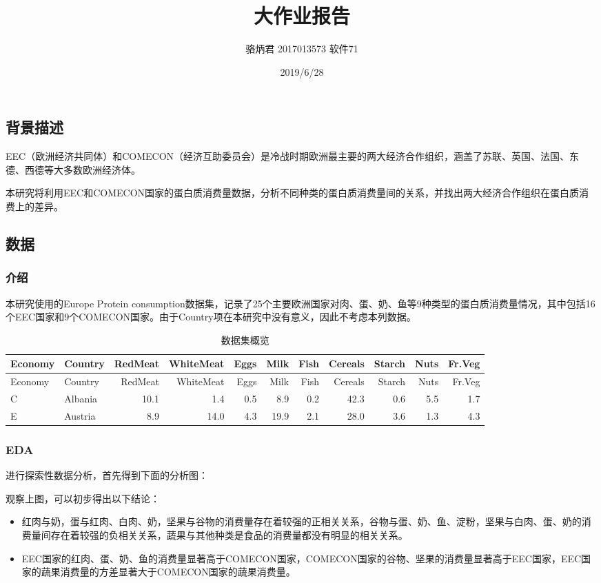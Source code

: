 \documentclass[]{article}
\title{大作业报告}
\author{骆炳君 2017013573 软件71}
\date{2019/6/28}
\providecommand{\tightlist}{%
  \setlength{\itemsep}{0pt}\setlength{\parskip}{0pt}}
\begin{document}
\maketitle

\subsection{背景描述}

EEC（欧洲经济共同体）和COMECON（经济互助委员会）是冷战时期欧洲最主要的两大经济合作组织，涵盖了苏联、英国、法国、东德、西德等大多数欧洲经济体。

本研究将利用EEC和COMECON国家的蛋白质消费量数据，分析不同种类的蛋白质消费量间的关系，并找出两大经济合作组织在蛋白质消费上的差异。

\subsection{数据}

\subsubsection{介绍}

本研究使用的Europe Protein
consumption数据集，记录了25个主要欧洲国家对肉、蛋、奶、鱼等9种类型的蛋白质消费量情况，其中包括16个EEC国家和9个COMECON国家。由于Country项在本研究中没有意义，因此不考虑本列数据。

\begin{longtable}[]{@{}llrrrrrrrrr@{}}
\caption{数据集概览}\tabularnewline
\toprule
Economy & Country & RedMeat & WhiteMeat & Eggs & Milk & Fish & Cereals &
Starch & Nuts & Fr.Veg\tabularnewline
\midrule
\endfirsthead
\toprule
Economy & Country & RedMeat & WhiteMeat & Eggs & Milk & Fish & Cereals &
Starch & Nuts & Fr.Veg\tabularnewline
\midrule
\endhead
C & Albania & 10.1 & 1.4 & 0.5 & 8.9 & 0.2 & 42.3 & 0.6 & 5.5 &
1.7\tabularnewline
E & Austria & 8.9 & 14.0 & 4.3 & 19.9 & 2.1 & 28.0 & 3.6 & 1.3 &
4.3\tabularnewline
\bottomrule
\end{longtable}

\hypertarget{eda}{%
\subsubsection{EDA}\label{eda}}

进行探索性数据分析，首先得到下面的分析图：

观察上图，可以初步得出以下结论：

\begin{itemize}
\tightlist
\item
  红肉与奶，蛋与红肉、白肉、奶，坚果与谷物的消费量存在着较强的正相关关系，谷物与蛋、奶、鱼、淀粉，坚果与白肉、蛋、奶的消费量间存在着较强的负相关关系，蔬果与其他种类是食品的消费量都没有明显的相关关系。
\item
  EEC国家的红肉、蛋、奶、鱼的消费量显著高于COMECON国家，COMECON国家的谷物、坚果的消费量显著高于EEC国家，EEC国家的蔬果消费量的方差显著大于COMECON国家的蔬果消费量。
\end{itemize}
\end{document}
